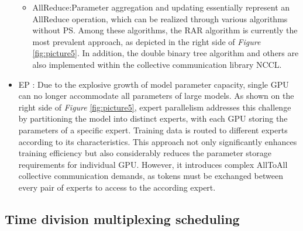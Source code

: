 \documentclass[conference]{IEEEtran}
\begin{document}
\begin{itemize}
\begin{itemize}
		\item AllReduce:Parameter aggregation and updating essentially represent an AllReduce operation, which can be realized through various algorithms without PS. Among these algorithms, the RAR algorithm is currently the most prevalent approach, as depicted in the right side of \emph{Figure} \ref{fig:picture5}. In addition, the double binary tree \cite{Tree} algorithm and others are also implemented within the collective communication library NCCL.
	\end{itemize}
	
	\item EP \cite{MoE}: Due to the explosive growth of model parameter capacity, single GPU can no longer accommodate all parameters of large models. As shown on the right side of \emph{Figure} \ref{fig:picture5}, expert parallelism addresses this challenge by partitioning the model into distinct experts, with each GPU storing the parameters of a specific expert. Training data is routed to different experts according to its characteristics. This approach not only significantly enhances training efficiency but also considerably reduces the parameter storage requirements for individual GPU. However, it introduces complex AllToAll collective communication demands, as tokens must be exchanged between every pair of experts to access to the according expert. 
\end{itemize}

\subsection{Time division multiplexing scheduling}

\end{document}
